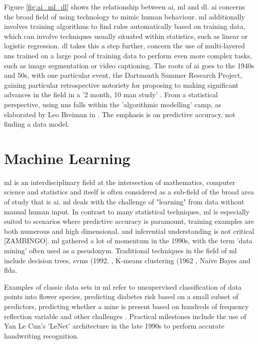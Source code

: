 Figure \ref{fig:ai_ml_dl} shows the relationship between \gls{ai}, \gls{ml} and \gls{dl}. \gls{ai} concerns the broad field of using technology to mimic human behaviour. \gls{ml} additionally involves training algorithms to find rules automatically based on training data, which can involve techniques usually situated within statistics, such as linear or logistic regression. \gls{dl} takes this a step further, concern the use of multi-layered \gls{nn}s trained on a large pool of training data to perform even more complex tasks, such as image segmentation or video captioning. The roots of \gls{ai} goes to the 1940s and 50s, with one particular event, the Dartmouth Summer Research Project, gaining particular retrospective notoriety for proposing to making significant advances in the field in a '2 month, 10 man study'  \cite{dartmouth_summer}. From a statistical perspective, using \gls{nn}s falls within the 'algorithmic modelling' camp, as elaborated by Leo Breiman in \cite{two_cultures}. The emphasis is on predictive accuracy, not finding a data model.

\section{Machine Learning}

\gls{ml} is an interdisciplinary field at the intersection of mathematics, computer science and statistics and itself is often considered as a sub-field of the broad area of study that is  \gls{ai}. \gls{ml} deals with the challenge of "learning" from data without manual human input. In contrast to many statistical techniques, \gls{ml} is especially suited to scenarios where predictive accuracy is paramount, training examples are both numerous and high dimensional, and inferential understanding is not critical [ZAMBINGO]. \gls{ml} gathered a lot of momentum in the 1990s, with the term 'data mining' often used as a pseudonym. Traditional techniques in the field of \gls{ml} include decision trees,  \gls{svm}s (1992, \cite{svm}, K-means clustering (1962 \cite{k_means}, Naive Bayes and  \gls{flda}.  \bigskip

Examples of classic data sets in \gls{ml} refer to unsupervised classification of data points into flower species, predicting diabetes risk based on a small subset of predictors, predicting whether a mine is present based on hundreds of frequency reflection variable and other challenges \cite{uci_ml_data}. Practical milestones include the use of Yan Le Cun's 'LeNet' architecture in the late 1990s to perform accurate handwriting recognition. 

